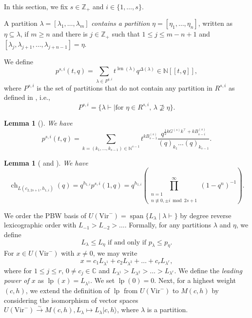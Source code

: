 \documentclass[a4paper, 12pt, reqno]{amsart}
\newtheorem{lemma}[theorem]{Lemma}
\theoremstyle{remark}
\DeclareMathOperator{\ch}{ch}
\DeclareMathOperator{\len}{len}
\DeclareMathOperator{\vspan}{span}
\DeclareMathOperator{\lp}{lp}
\newcommand{\Vir}{{\mathrm{Vir}}}
\begin{document}
In this section, we fix $s \in \mathbb{Z}_+$ and $i \in \{1, \dots, s\}$.

A partition $\lambda = [\lambda_1, \dots, \lambda_m]$ \emph{contains a partition} $\eta = [\eta_1, \dots, \eta_n]$, written as $\eta \subseteq \lambda$, if $m \ge n$ and there is $j \in \mathbb{Z}_+$ such that $1 \le j \le m - n + 1$ and $[\lambda_j, \lambda_{j + 1}, \dots, \lambda_{j + n - 1}] = \eta$.

We define
\begin{equation*}
  p^{s, i}(t, q) = \sum_{\lambda \in P^{s, i}}t^{\len(\lambda)}q^{\Delta(\lambda)} \in \mathbb{N}[[t, q]],
\end{equation*}
where $P^{s, i}$ is the set of partitions that do not contain any partition in $R^{s, i}$ as defined in , i.e.,
\begin{equation*}
  P^{s, i} = \{\lambda \vdash \mid \text{for $\eta \in R^{s, i}$, $\lambda \nsupseteq \eta$}\}.
\end{equation*}

\begin{lemma}[{\cite[\S7]{andrews_theory_1998}}]
  \label{lmm:3}
  We have
  \begin{equation*}
    p^{s, i}(t, q) = \sum_{k = (k_1, \dots, k_{s - 1}) \in \mathbb{N}^{s - 1}}t^{kB^{(s)}_{s - 1}}\frac{q^{\frac{1}{2}kG^{(s)}k^\top + kB^{(s)}_{s - i}}}{(q)_{k_1}\dots(q)_{k_{s - 1}}}.
  \end{equation*}
\end{lemma}

\begin{lemma}[{\cite{feigin_verma_1984} and \cite[\S7]{andrews_theory_1998}}]
  \label{lmm:4}
  We have
  \begin{equation*}
    \ch_{L(c_{2, 2s + 1}, h_{1, i})}(q) = q^{h_{1, i}}p^{s, i}(1, q) = q^{h_{1, i}}\left(\prod^{\infty}_{\substack{n = 1 \\ n \not\equiv 0, \pm i \bmod 2s + 1}}(1 - q^n)^{-1}\right).
  \end{equation*}
\end{lemma}

We order the PBW basis of $U(\Vir^-) = \vspan\{L_{\lambda} \mid \lambda \vdash\}$ by degree reverse lexicographic order with $L_{-1} > L_{-2} > \dots$.
Formally, for any partitions $\lambda$ and $\eta$, we define
\begin{equation*}
  L_\lambda \le L_\eta\text{ if and only if }p_\lambda \le p_\eta.
\end{equation*}
For $x \in U(\Vir^-)$ with $x \neq 0$, we may write
\begin{equation*}
  x = c_1L_{\lambda^1} + c_2L_{\lambda^2} + \dots + c_rL_{\lambda^r},
\end{equation*}
where for $1 \le j \le r$, $0 \neq c_j \in \mathbb{C}$ and $L_{\lambda^1} > L_{\lambda^2} > \dots > L_{\lambda^r}$.
We define the \emph{leading power of $x$} as $\lp(x) = L_{\lambda^1}$.
We set $\lp(0) = 0$.
Next, for a highest weight $(c, h)$, we extend the definition of $\lp$ from $U(\Vir^-)$ to $M(c, h)$ by considering the isomorphism of vector spaces $U(\Vir^-) \xrightarrow{\sim} M(c, h), L_\lambda \mapsto L_\lambda|c, h\rangle$, where $\lambda$ is a partition.
\end{document}
